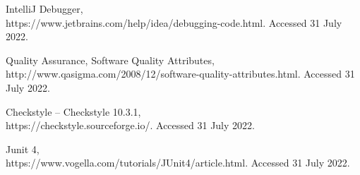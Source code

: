 \documentclass[12pt, a4paper]{article}
\begin{document}
\begin{thebibliography}{20}
	IntelliJ Debugger,\\
	https://www.jetbrains.com/help/idea/debugging-code.html. Accessed 31 July 2022.
	
	Quality Assurance, Software Quality Attributes,\\
	http://www.qasigma.com/2008/12/software-quality-attributes.html. Accessed 31 July 2022.
	
	
	Checkstyle – Checkstyle 10.3.1,\\
	https://checkstyle.sourceforge.io/. Accessed 31 July 2022.
	
	Junit 4,\\
	https://www.vogella.com/tutorials/JUnit4/article.html. Accessed 31 July 2022.
	
\end{thebibliography}

\newpage
\end{document}

